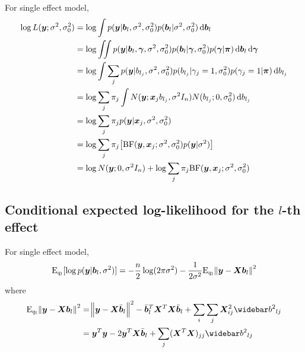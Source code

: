 For single effect model,
\begin{align}
    \log L(\vy; \rv, \rv_0) &= \log \int p(\vy | \vb_l, \rv, \rv_0) p(\vb_l | \rv, \rv_0) \dif \vb_l\\
    &= \log \iint p(\vy | \vb_l, \vgamma, \rv, \rv_0) p(\vb_l | \vgamma, \rv_0) p(\vgamma | \vpi)  \dif \vb_l \dif \vgamma \\
    &= \log \int \sum_j p(\vy | b_{l_j}, \rv, \rv_0) p(b_{l_j}|\gamma_j = 1, \rv_0) p(\gamma_j = 1 | \vpi) \dif b_{l_j} \\
    &= \log \sum_j \pi_j \int N(\vy; \vx_jb_{l_j}, \rv I_n) N(b_{l_j}; 0, \rv_0) \dif b_{l_j} \\
    &= \log \sum_j \pi_j p(\vy|\vx_j, \rv, \rv_0) \\
    &= \log \sum_j \pi_j \big[\BF(\vy, \vx_j; \rv, \rv_0)p(\vy|\rv) \big]\\
    &= \log N(\vy; 0, \rv I_n) + \log \sum_j \pi_j \BF(\vy, \vx_j; \rv, \rv_0) \label{eqn:lmarginal}
\end{align}

\subsection{Conditional expected log-likelihood for the $l$-th effect}

For single effect model,
\begin{equation}
    \text{E}_{q_l}[\log p(\bm y|\bm b_l,\sigma^2)] = -\frac{n}{2}\log(2\pi\sigma^2) - \frac{1}{2\sigma^2}\text{E}_{q_l}\norm{\bm y - \bm X\bm b_l}^2  \label{eqn:lconditional}
\end{equation}
where
\begin{align}
    \E_{q_l}\norm{\vy - \mx\vb_l}^2 &= \norm{\vy - \mx \vbb_l}^2 - \vbb_l^T\mx^T\mx \vbb_l + \sum_i \sum_j \mx_{ij}^2 \bbb_{lj} \\
    &= \vy^T\vy -2 \vy^T \mx \vbb_l  + \sum_j (\mx^T \mx)_{jj} \bbb_{lj}
\end{align}

